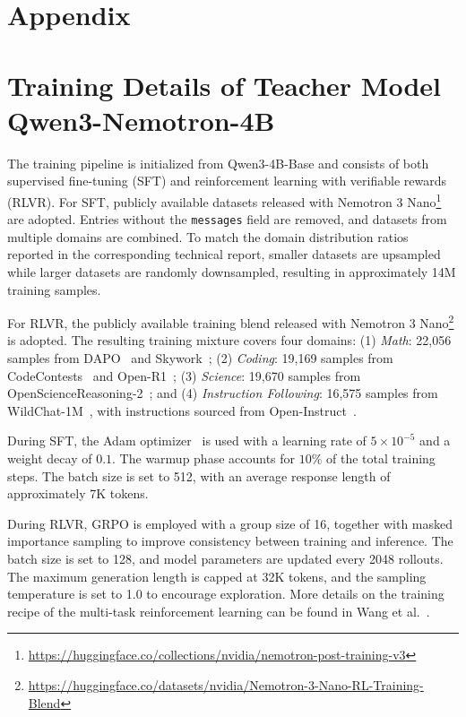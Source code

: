 \documentclass{article} %
\renewcommand{\cite}[1]{\citep{#1}}
\begin{document}



\newpage
\appendix
\onecolumn

\section*{Appendix}
\section{Training Details of Teacher Model Qwen3-Nemotron-4B}\label{sec:appendix}

The training pipeline is initialized from Qwen3-4B-Base and consists of both supervised fine-tuning (SFT) and reinforcement learning with verifiable rewards (RLVR). For SFT, publicly available datasets released with Nemotron 3 Nano\footnote{\url{https://huggingface.co/collections/nvidia/nemotron-post-training-v3}}~\citep{blakeman2025nemotron} are adopted. Entries without the \texttt{messages} field are removed, and datasets from multiple domains are combined. To match the domain distribution ratios reported in the corresponding technical report, smaller datasets are upsampled while larger datasets are randomly downsampled, resulting in approximately 14M training samples.

For RLVR, the publicly available training blend released with Nemotron 3 Nano\footnote{\url{https://huggingface.co/datasets/nvidia/Nemotron-3-Nano-RL-Training-Blend}} is adopted. The resulting training mixture covers four domains: (1) \textit{Math}: 22,056 samples from DAPO~\citep{yu2025dapo} and Skywork~\citep{he2025skywork,skywork-or1-2025}; (2) \textit{Coding}: 19,169 samples from CodeContests~\citep{li2022competition} and Open-R1~\citep{penedo2025codeforces}; (3) \textit{Science}: 19,670 samples from OpenScienceReasoning-2~\citep{open_science_reasoning_2_2025}; and (4) \textit{Instruction Following}: 16,575 samples from WildChat-1M~\citep{zhao2024wildchat}, with instructions sourced from Open-Instruct~\citep{lambert2024tulu}.

During SFT, the Adam optimizer~\citep{kingma2014adam} is used with a learning rate of $5 \times 10^{-5}$ and a weight decay of $0.1$. The warmup phase accounts for $10\%$ of the total training steps. The batch size is set to 512, with an average response length of approximately 7K tokens.

During RLVR, GRPO is employed with a group size of 16, together with masked importance sampling to improve consistency between training and inference. The batch size is set to 128, and model parameters are updated every 2048 rollouts. The maximum generation length is capped at 32K tokens, and the sampling temperature is set to 1.0 to encourage exploration. 
More details on the training recipe of the multi-task reinforcement learning can be found in Wang et al.~\cite{wang2026mix}.
\end{document}
